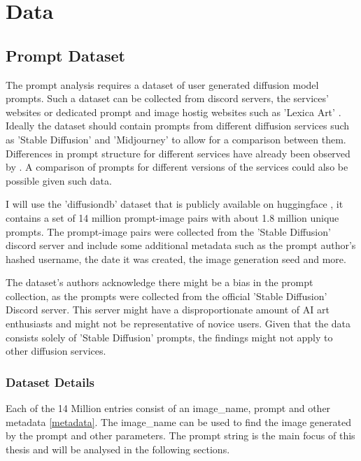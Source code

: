 \chapter{Data}
\label{cha:Data}

\section{Prompt Dataset}

The prompt analysis requires a dataset of user generated diffusion model prompts. Such a dataset can be collected from discord servers, the services' websites or dedicated prompt and image hostig websites such as 'Lexica Art' \autocite{lexica}. Ideally the dataset should contain prompts from different diffusion services such as 'Stable Diffusion' and 'Midjourney' to allow for a comparison between them. Differences in prompt structure for different services have already been observed by \autocite{ramesh}.
A comparison of prompts for different versions of the services could also be possible given such data.

I will use the 'diffusiondb' dataset that is publicly available on huggingface \autocite{poloclub-diffusiondb}, it contains a set of 14 million prompt-image pairs with about 1.8 million unique prompts. The prompt-image pairs were collected from the 'Stable Diffusion' discord server and include some additional metadata such as the prompt author's hashed username, the date it was created, the image generation seed and more.

The dataset's authors \autocite{poloclub-diffusiondb} acknowledge there might be a bias in the prompt collection, as the prompts were collected from the official 'Stable Diffusion' Discord server. This server might have a disproportionate amount of AI art enthusiasts and might not be representative of novice users.
Given that the data consists solely of 'Stable Diffusion' prompts, the findings might not apply to other diffusion services.


\subsection{Dataset Details}

Each of the 14 Million entries consist of an image\_name, prompt and other metadata \ref{metadata}. The image\_name can be used to find the image generated by the prompt and other parameters. The prompt string is the main focus of this thesis and will be analysed in the following sections.

